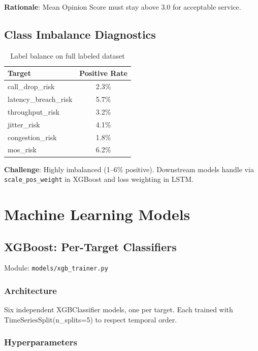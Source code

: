 \documentclass[11pt,a4paper,oneside]{report}
\begin{document}
\textbf{Rationale}: Mean Opinion Score must stay above 3.0 for acceptable service.

\section{Class Imbalance Diagnostics}

\begin{table}[h]
\centering
\begin{tabular}{lc}
\toprule
\textbf{Target} & \textbf{Positive Rate} \\
\midrule
call\_drop\_risk & 2.3\% \\
latency\_breach\_risk & 5.7\% \\
throughput\_risk & 3.2\% \\
jitter\_risk & 4.1\% \\
congestion\_risk & 1.8\% \\
mos\_risk & 6.2\% \\
\bottomrule
\end{tabular}
\caption{Label balance on full labeled dataset}
\end{table}

\textbf{Challenge}: Highly imbalanced (1--6\% positive). Downstream models handle via \texttt{scale\_pos\_weight} in XGBoost and loss weighting in LSTM.

\newpage

\chapter{Machine Learning Models}

\section{XGBoost: Per-Target Classifiers}

Module: \texttt{models/xgb\_trainer.py}

\subsection{Architecture}

Six independent XGBClassifier models, one per target. Each trained with TimeSeriesSplit(n\_splits=5) to respect temporal order.

\subsection{Hyperparameters}
\end{document}
